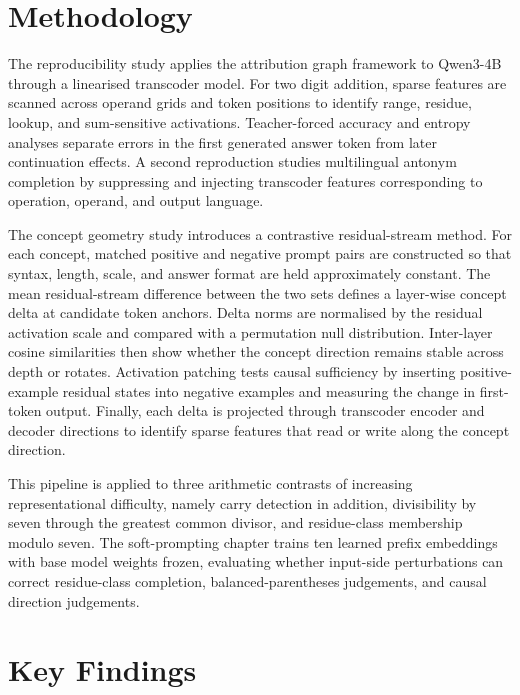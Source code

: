 \documentclass[11pt,a4paper]{article}
\begin{document}
\section{Methodology}

The reproducibility study applies the attribution graph framework to Qwen3-4B
through a linearised transcoder model. For two digit addition, sparse features
are scanned across operand grids and token positions to identify range,
residue, lookup, and sum-sensitive activations. Teacher-forced accuracy and
entropy analyses separate errors in the first generated answer token from later
continuation effects. A second reproduction studies multilingual antonym
completion by suppressing and injecting transcoder features corresponding to
operation, operand, and output language.

The concept geometry study introduces a contrastive residual-stream method.
For each concept, matched positive and negative prompt pairs are constructed so
that syntax, length, scale, and answer format are held approximately constant.
The mean residual-stream difference between the two sets defines a layer-wise
concept delta at candidate token anchors. Delta norms are normalised by the
residual activation scale and compared with a permutation null distribution.
Inter-layer cosine similarities then show whether the concept direction remains
stable across depth or rotates. Activation patching tests causal sufficiency by
inserting positive-example residual states into negative examples and measuring
the change in first-token output. Finally, each delta is projected through
transcoder encoder and decoder directions to identify sparse features that read
or write along the concept direction.

This pipeline is applied to three arithmetic contrasts of increasing
representational difficulty, namely carry detection in addition, divisibility by
seven through the greatest common divisor, and residue-class membership modulo
seven. The soft-prompting chapter trains ten learned prefix embeddings with base
model weights frozen, evaluating whether input-side perturbations can correct
residue-class completion, balanced-parentheses judgements, and causal direction
judgements.

\section{Key Findings}
\end{document}
